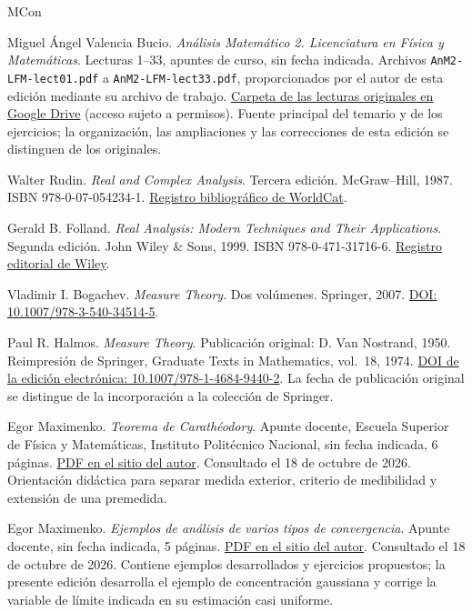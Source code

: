 \begin{thebibliography}{MCon}
Miguel Ángel Valencia Bucio. \emph{Análisis Matemático 2. Licenciatura en Física y Matemáticas}. Lecturas 1--33, apuntes de curso, sin fecha indicada. Archivos \texttt{AnM2-LFM-lect01.pdf} a \texttt{AnM2-LFM-lect33.pdf}, proporcionados por el autor de esta edición mediante su archivo de trabajo. \href{https://drive.google.com/drive/folders/1HCg3CqIJdUGJjejVX_C304OPpPtwAu44}{Carpeta de las lecturas originales en Google Drive} (acceso sujeto a permisos). Fuente principal del temario y de los ejercicios; la organización, las ampliaciones y las correcciones de esta edición se distinguen de los originales.

Walter Rudin. \emph{Real and Complex Analysis}. Tercera edición. McGraw--Hill, 1987. ISBN 978-0-07-054234-1. \href{https://search.worldcat.org/title/13093736}{Registro bibliográfico de WorldCat}.

Gerald B. Folland. \emph{Real Analysis: Modern Techniques and Their Applications}. Segunda edición. John Wiley \& Sons, 1999. ISBN 978-0-471-31716-6. \href{https://www.wiley.com/en-us/Real+Analysis\%3A+Modern+Techniques+and+Their+Applications\%2C+2nd+Edition-p-9780471317166}{Registro editorial de Wiley}.

Vladimir I. Bogachev. \emph{Measure Theory}. Dos volúmenes. Springer, 2007. \href{https://doi.org/10.1007/978-3-540-34514-5}{DOI: 10.1007/978-3-540-34514-5}.

Paul R. Halmos. \emph{Measure Theory}. Publicación original: D. Van Nostrand, 1950. Reimpresión de Springer, Graduate Texts in Mathematics, vol.~18, 1974. \href{https://doi.org/10.1007/978-1-4684-9440-2}{DOI de la edición electrónica: 10.1007/978-1-4684-9440-2}. La fecha de publicación original se distingue de la incorporación a la colección de Springer.

Egor Maximenko. \emph{Teorema de Carathéodory}. Apunte docente, Escuela Superior de Física y Matemáticas, Instituto Politécnico Nacional, sin fecha indicada, 6 páginas. \href{https://esfm.egormaximenko.com/analysis/Caratheodory_extension_theorem_es.pdf}{PDF en el sitio del autor}. Consultado el 18 de octubre de 2026. Orientación didáctica para separar medida exterior, criterio de medibilidad y extensión de una premedida.

Egor Maximenko. \emph{Ejemplos de análisis de varios tipos de convergencia}. Apunte docente, sin fecha indicada, 5 páginas. \href{https://esfm.egormaximenko.com/analysis/convergence_examples_es.pdf}{PDF en el sitio del autor}. Consultado el 18 de octubre de 2026. Contiene ejemplos desarrollados y ejercicios propuestos; la presente edición desarrolla el ejemplo de concentración gaussiana y corrige la variable de límite indicada en su estimación casi uniforme.


\end{thebibliography}
